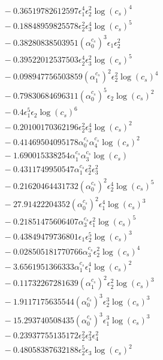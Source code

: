 \documentclass[10pt]{article}
\begin{document}
\begin{align*}
&{}  - 0.36519782612597 \epsilon_{1}^{4} \epsilon_{2}^{2} \log{\left(c_{s} \right)}^{4} \\
&{}  - 0.18848959825578 \epsilon_{2}^{2} \epsilon_{3}^{4} \log{\left(c_{s} \right)}^{5} \\
&{}  - 0.38280838503951 \left(\alpha_{0}^{c_s}\right)^{3} \epsilon_{1} \epsilon_{2}^{2} \\
&{}  - 0.39522012537503 \epsilon_{2}^{4} \epsilon_{3}^{2} \log{\left(c_{s} \right)}^{5} \\
&{}  - 0.098947756503859 \left(\alpha_{1}^{c_s}\right)^{2} \epsilon_{2}^{2} \log{\left(c_{s} \right)}^{4} \\
&{}  - 0.79830684696311 \left(\alpha_{0}^{c_s}\right)^{5} \epsilon_{2} \log{\left(c_{s} \right)}^{2} \\
&{}  - 0.4 \epsilon_{1}^{5} \epsilon_{2} \log{\left(c_{s} \right)}^{6} \\
&{}  - 0.20100170362196 \epsilon_{2}^{2} \epsilon_{3}^{4} \log{\left(c_{s} \right)}^{2} \\
&{}  - 0.41469504095178 \alpha_{0}^{c_s} \alpha_{4}^{c_s} \log{\left(c_{s} \right)}^{2} \\
&{}  - 1.690015338254 \alpha_{1}^{c_s} \alpha_{3}^{c_s} \log{\left(c_{s} \right)} \\
&{}  - 0.4311749950547 \alpha_{1}^{c_s} \epsilon_{2}^{2} \epsilon_{3}^{2} \\
&{}  - 0.21620464431732 \left(\alpha_{0}^{c_s}\right)^{2} \epsilon_{2}^{4} \log{\left(c_{s} \right)}^{5} \\
&{}  - 27.91422204352 \left(\alpha_{0}^{c_s}\right)^{2} \epsilon_{1}^{4} \log{\left(c_{s} \right)}^{3} \\
&{}  - 0.21851475606407 \alpha_{3}^{c_s} \epsilon_{1}^{2} \log{\left(c_{s} \right)}^{5} \\
&{}  - 0.43849479736801 \epsilon_{1} \epsilon_{2}^{5} \log{\left(c_{s} \right)}^{3} \\
&{}  - 0.028505181770766 \alpha_{3}^{c_s} \epsilon_{2}^{2} \log{\left(c_{s} \right)}^{4} \\
&{}  - 3.6561951366333 \alpha_{1}^{c_s} \epsilon_{1}^{4} \log{\left(c_{s} \right)}^{2} \\
&{}  - 0.11732267281639 \left(\alpha_{1}^{c_s}\right)^{2} \epsilon_{2}^{2} \log{\left(c_{s} \right)}^{3} \\
&{}  - 1.9117175635544 \left(\alpha_{0}^{c_s}\right)^{3} \epsilon_{2}^{3} \log{\left(c_{s} \right)}^{3} \\
&{}  - 15.293740508435 \left(\alpha_{0}^{c_s}\right)^{3} \epsilon_{1}^{3} \log{\left(c_{s} \right)}^{3} \\
&{}  - 0.23937755135172 \epsilon_{2}^{2} \epsilon_{3}^{2} \epsilon_{4}^{2} \\
&{}  - 0.48058387632188 \epsilon_{2}^{5} \epsilon_{3} \log{\left(c_{s} \right)}^{2}
\end{align*}
\end{document}
